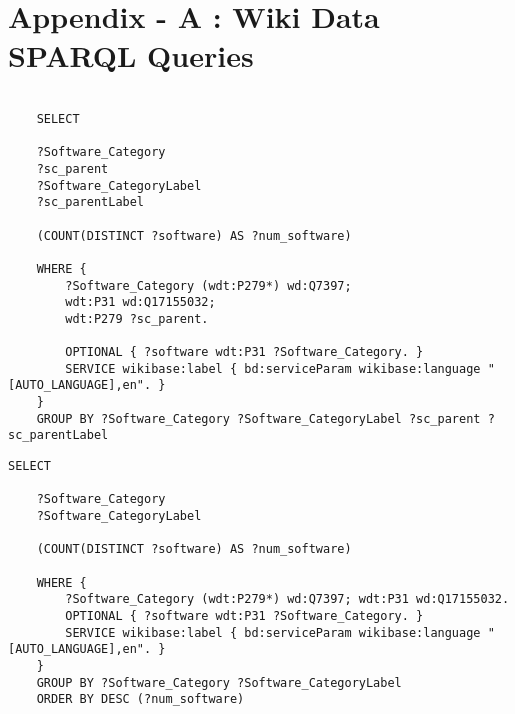\chapter{Appendix - A : Wiki Data SPARQL Queries}
\label{ch:classicthesis}
\begin{lstlisting}[language=SPARQL,frame=tb,caption={SARQL Query for software categories},label=lst:useless]
	
	SELECT 
	
	?Software_Category 
	?sc_parent 
	?Software_CategoryLabel 
	?sc_parentLabel 
	
	(COUNT(DISTINCT ?software) AS ?num_software) 
	
	WHERE {	
		?Software_Category (wdt:P279*) wd:Q7397;
		wdt:P31 wd:Q17155032;
		wdt:P279 ?sc_parent.
		
		OPTIONAL { ?software wdt:P31 ?Software_Category. }
		SERVICE wikibase:label { bd:serviceParam wikibase:language "[AUTO_LANGUAGE],en". }
	}
	GROUP BY ?Software_Category ?Software_CategoryLabel ?sc_parent ?sc_parentLabel

\end{lstlisting}

\begin{lstlisting}[language=SPARQL,frame=tb,caption={SPARQL query of software counts in each category},label=lst:useless]
	SELECT 
	
	?Software_Category 
	?Software_CategoryLabel 
	
	(COUNT(DISTINCT ?software) AS ?num_software) 
	
	WHERE {	
		?Software_Category (wdt:P279*) wd:Q7397; wdt:P31 wd:Q17155032.
		OPTIONAL { ?software wdt:P31 ?Software_Category. }
		SERVICE wikibase:label { bd:serviceParam wikibase:language "[AUTO_LANGUAGE],en". }
	}
	GROUP BY ?Software_Category ?Software_CategoryLabel
	ORDER BY DESC (?num_software)
\end{lstlisting}
